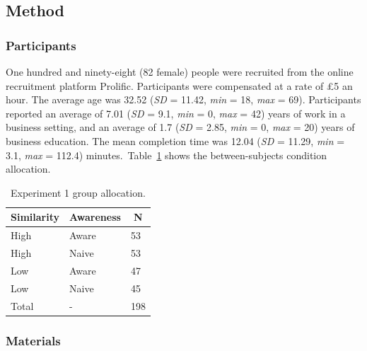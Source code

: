 \documentclass[a4paper, nobind, dvipsnames]{templates/ociamthesis}
\theoremstyle{definition}
\theoremstyle{definition}
\theoremstyle{definition}
\theoremstyle{definition}
\theoremstyle{remark}
\begin{document}
\subsection{Method}

\subsubsection{Participants}

One hundred and ninety-eight (82 female) people were recruited from the online recruitment platform Prolific. Participants were compensated at a rate of £5 an hour. The average age was 32.52 (\emph{SD} = 11.42, \emph{min} = 18, \emph{max} = 69). Participants reported an average of 7.01 (\emph{SD} = 9.1, \emph{min} = 0, \emph{max} = 42) years of work in a business setting, and an average of 1.7 (\emph{SD} = 2.85, \emph{min} = 0, \emph{max} = 20) years of business education. The mean completion time was 12.04 (\emph{SD} = 11.29, \emph{min} = 3.1, \emph{max} = 112.4) minutes.~Table~\ref{tab:condition-allocation-aggregation-1}
shows the between-subjects condition allocation.

\begin{table}[tbp]

\begin{center}
\begin{threeparttable}

\caption{\label{tab:condition-allocation-aggregation-1}Experiment 1 group allocation.}

\begin{tabular}{lll}
\toprule
Similarity & \multicolumn{1}{c}{Awareness} & \multicolumn{1}{c}{N}\\
\midrule
High & Aware & 53\\
High & Naive & 53\\
Low & Aware & 47\\
Low & Naive & 45\\
Total & - & 198\\
\bottomrule
\end{tabular}

\end{threeparttable}
\end{center}

\end{table}

\subsubsection{Materials}
\end{document}
